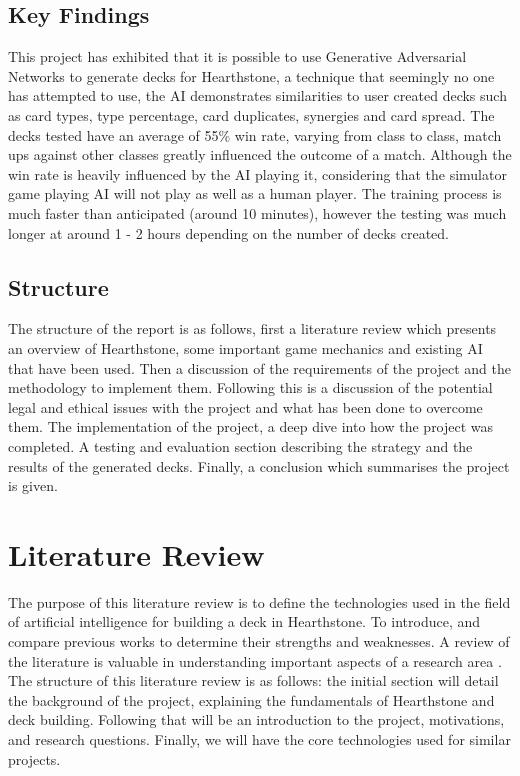 \documentclass{report} %
\begin{document}
\section{Key Findings}
This project has exhibited that it is possible to use Generative Adversarial Networks to generate decks for Hearthstone, a technique that seemingly no one has attempted to use, the AI demonstrates similarities to user created decks such as card types, type percentage, card duplicates, synergies and card spread. The decks tested have an average of 55\% win rate, varying from class to class, match ups against other classes greatly influenced the outcome of a match. Although the win rate is heavily influenced by the AI playing it, considering that the simulator game playing AI will not play as well as a human player. The training process is much faster than anticipated (around 10 minutes), however the testing was much longer at around 1 - 2 hours depending on the number of decks created.
\section{Structure}
The structure of the report is as follows, first a literature review which presents an overview of Hearthstone, some important game mechanics and existing AI that have been used. Then a discussion  of  the  requirements  of  the  project  and  the  methodology  to implement them. Following this is a discussion of the potential legal and ethical issues with the project and what has been done to overcome them. The implementation of the project, a deep dive into how the project was completed. A testing and evaluation section describing the strategy and the results of the generated decks. Finally, a conclusion which summarises the project is given.

\chapter{Literature Review}
The purpose of this literature review is to define the technologies used in the field of artificial intelligence for building a deck in Hearthstone. To introduce, and compare previous works to determine their strengths and weaknesses. A review of the literature is valuable in understanding important aspects of a research area \cite{Isaacs2020}. The structure of this literature review is as follows: the initial section will detail the background of the project, explaining the fundamentals of Hearthstone and deck building. Following that will be an introduction to the project,  motivations, and research questions. Finally, we will have the core technologies used for similar projects.
\end{document}
